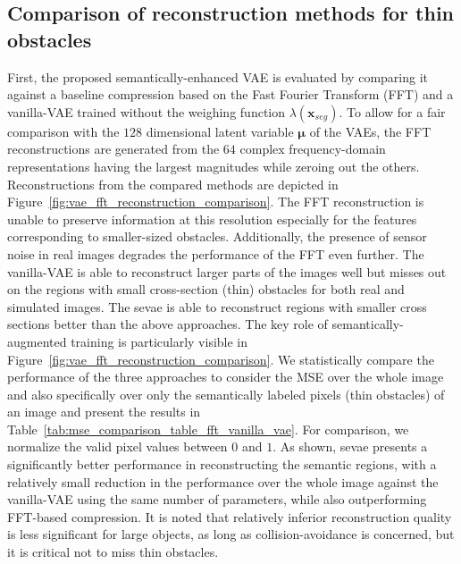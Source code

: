 \subsection{Comparison of reconstruction methods for thin obstacles}\label{sec:reconstruction_comparison}
First, the proposed semantically-enhanced VAE is evaluated by comparing it against a baseline compression based on the Fast Fourier Transform (FFT) and a vanilla-VAE trained without the weighing function $\lambda(\mathbf{x}_{seg})$. To allow for a fair comparison with the $128$ dimensional latent variable $\bm{\mu}$ of the VAEs, the FFT reconstructions are generated from the $64$ complex frequency-domain representations having the largest magnitudes while zeroing out the others. Reconstructions from the compared methods are depicted in Figure~\ref{fig:vae_fft_reconstruction_comparison}. 
The FFT reconstruction is unable to preserve information at this resolution especially for the features corresponding to smaller-sized obstacles. Additionally, the presence of sensor noise in real images degrades the performance of the FFT even further. The vanilla-VAE is able to reconstruct larger parts of the images well but misses out on the regions with small cross-section (thin) obstacles for both real and simulated images. The \ac{sevae} is able to reconstruct regions with smaller cross sections better than the above approaches. The key role of semantically-augmented training is particularly visible in Figure~\ref{fig:vae_fft_reconstruction_comparison}. We statistically compare the performance of the three approaches to consider the MSE over the whole image and also specifically over only the semantically labeled pixels (thin obstacles) of an image and present the results in Table~\ref{tab:mse_comparison_table_fft_vanilla_vae}. For comparison, we normalize the valid pixel values between $0$ and $1$. As shown, \ac{sevae} presents a significantly better performance in reconstructing the semantic regions, with a relatively small reduction in the performance over the whole image against the vanilla-VAE using the same number of parameters, while also outperforming FFT-based compression. It is noted that relatively inferior reconstruction quality is less significant for large objects, as long as collision-avoidance is concerned, but it is critical not to miss thin obstacles. 


